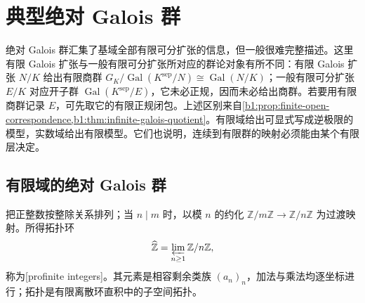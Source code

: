 
\section{典型绝对 Galois 群}
\label{b1:sec:2204}

绝对 Galois 群汇集了基域全部有限可分扩张的信息，但一般很难完整描述。这里有限 Galois 扩张与一般有限可分扩张所对应的群论对象有所不同：有限 Galois 扩张 \(N/K\) 给出有限商群 \(G_K/\operatorname{Gal}(K^{\mathrm{sep}}/N)\cong\operatorname{Gal}(N/K)\)；一般有限可分扩张 \(E/K\) 对应开子群 \(\operatorname{Gal}(K^{\mathrm{sep}}/E)\)，它未必正规，因而未必给出商群。若要用有限商群记录 \(E\)，可先取它的有限正规闭包。上述区别来自\cref{b1:prop:finite-open-correspondence,b1:thm:infinite-galois-quotient}。有限域给出可显式写成逆极限的模型，实数域给出有限模型。它们也说明，连续到有限群的映射必须能由某个有限层决定。

%
%

\subsection{有限域的绝对 Galois 群}
\label{b1:subsec:2204:01}
把正整数按整除关系排列；当 \(n\mid m\) 时，以模 \(n\) 的约化 \(\mathbb Z/m\mathbb Z\rightarrow\mathbb Z/n\mathbb Z\) 为过渡映射。所得拓扑环
\[
	\widehat{\vphantom{Z}\mathbb Z}=\varprojlim_{n\geq1}\mathbb Z/n\mathbb Z,
\]
称为[profinite integers]。其元素是相容剩余类族 \((a_n)_n\)，加法与乘法均逐坐标进行；拓扑是有限离散环直积中的子空间拓扑。

